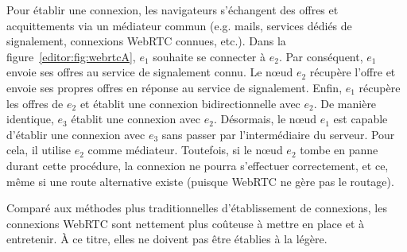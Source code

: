 \noindent Pour établir une connexion, les navigateurs s'échangent des offres et
acquittements via un médiateur commun (e.g. mails, services dédiés de
signalement, connexions WebRTC connues, etc.). Dans la figure~\ref{editor:fig:webrtcA},
$e_1$ souhaite se connecter à $e_2$. Par conséquent, $e_1$ envoie ses offres au
service de signalement connu. Le nœud $e_2$ récupère l'offre et envoie ses
propres offres en réponse au service de signalement. Enfin, $e_1$ récupère les
offres de $e_2$ et établit une connexion bidirectionnelle avec $e_2$. De manière
identique, $e_3$ établit une connexion avec $e_2$. Désormais, le nœud $e_1$ est
capable d'établir une connexion avec $e_3$ sans passer par l'intermédiaire du
serveur. Pour cela, il utilise $e_2$ comme médiateur. Toutefois, si le nœud
$e_2$ tombe en panne durant cette procédure, la connexion ne pourra s'effectuer
correctement, et ce, même si une route alternative existe (puisque WebRTC ne
gère pas le routage).

\noindent Comparé aux méthodes plus traditionnelles d'établissement de
connexions, les connexions WebRTC sont nettement plus coûteuse à mettre en place
et à entretenir. À ce titre, elles ne doivent pas être établies à la légère.









